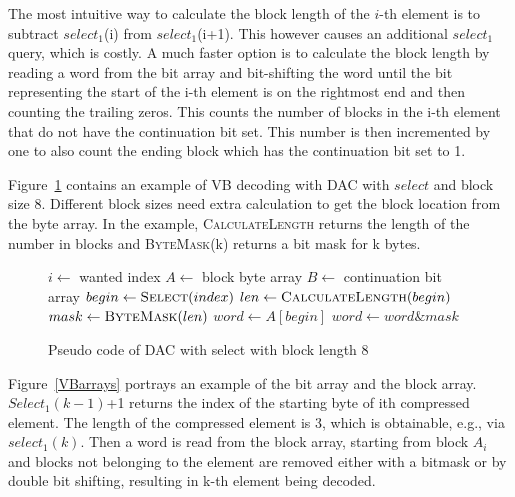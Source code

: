 The most intuitive way to calculate the block length of the $i$-th element is to subtract $select_1$(i) from $select_1$(i+1). This however causes an additional 
$select_1$ query, which is costly. A much faster option is to calculate the block length by reading a word from the bit array and bit-shifting the word until the bit representing the start of the i-th
element is on the rightmost end and then counting the trailing zeros. This counts the number of blocks in the i-th element that do not have the continuation bit set. This number is then incremented by one to 
also count the ending block which has the continuation bit set to 1.
 
Figure~\ref{select_pseudo} contains an example of VB decoding with DAC with $select$ and block size 8. 
Different block sizes need extra calculation to get the block location from the byte array. In the example, \textsc{CalculateLength} returns the length of the number in blocks and \textsc{ByteMask}(k) returns 
a bit mask for k bytes. 

\begin{figure}[ht]
\centering
\begin{algorithmic}
\State $i \gets $ wanted index
\State $A \gets $ block byte array
\State $B \gets $ continuation bit array
\State $begin \gets \Call{Select}{index}$
\State $len \gets \Call{CalculateLength}{begin}$
\State $mask \gets \Call{ByteMask}{len}$
\State $word \gets A[begin]$ 
\State $word \gets word \mathbin{\&} mask$ 


\end{algorithmic}
\caption{Pseudo code of DAC with select with block length 8} \label{select_pseudo}
\end{figure}

Figure~\ref{VBarrays} portrays an example of the bit array and the block array. $Select_1(k-1)$+1 returns the index of the starting byte of ith compressed element. The length of the compressed 
element is 3, which is obtainable, e.g., via $select_1(k)$. Then a word is read from the block array, starting from block $A_i$ and blocks not belonging to the element
are removed either with a bitmask or by double bit shifting, resulting in k-th element being decoded.


